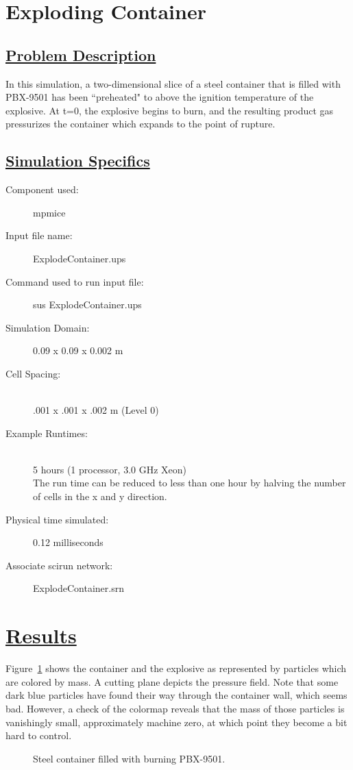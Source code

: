 \documentclass[fleqn]{article}
\begin{document}
\section*{\center Exploding Container}
\subsection*{\underline{Problem Description}}

In this simulation, a two-dimensional slice of a steel container that
is filled with PBX-9501 has been ``preheated" to above the ignition temperature
of the explosive.  At t=0, the explosive begins to burn, and the resulting
product gas pressurizes the container which expands to the point of rupture.

\subsection*{\underline{Simulation Specifics}}
\begin{description} 
\item [Component used:] \hfill mpmice
\item [Input file name:] \hfill ExplodeContainer.ups
\item [Command used to run input file:]\hfill sus ExplodeContainer.ups

\item [Simulation Domain:]\hfill    0.09 x 0.09 x 0.002 m

\item [Cell Spacing:]\hfill \\ 
.001 x .001 x .002 m (Level 0)

\item [Example Runtimes:] \hfill \\
 5 hours   (1 processor, 3.0 GHz Xeon)\\
 The run time can be reduced to less than one hour by halving the number
 of cells in the x and y direction.

\item [Physical time simulated:] \hfill 0.12 milliseconds

\item [Associate scirun network:] \hfill ExplodeContainer.srn

\end{description}

\section*{\underline{Results}}

Figure~\ref{figexpcont} shows the container and the explosive as
represented by particles which are colored by mass.  A cutting plane
depicts the pressure field.  Note that some dark blue particles have
found their way through the container wall, which seems bad.  However,
a check of the colormap reveals that the mass of those particles is
vanishingly small, approximately machine zero, at which point they
become a bit hard to control.

\begin{figure}[b]
  \center
  \caption{Steel container filled with burning PBX-9501.}
  \label{figexpcont}
\end{figure}
\end{document}
